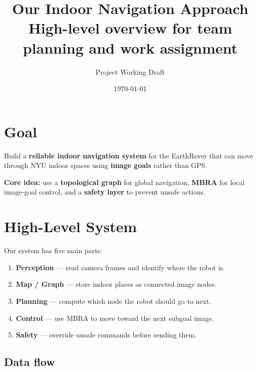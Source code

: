 \documentclass[11pt,a4paper]{article}
\title{Our Indoor Navigation Approach\\[0.3em]
\large High-level overview for team planning and work assignment}
\author{Project Working Draft}
\date{\today}
\begin{document}
\maketitle
\begin{center}
\end{center}
\vspace{1em}

\section{Goal}

Build a \textbf{reliable indoor navigation system} for the EarthRover that can
move through NYU indoor spaces using \textbf{image goals} rather than GPS.

\begin{mdframed}
\textbf{Core idea:} use a \textbf{topological graph} for global navigation,
\textbf{MBRA} for local image-goal control, and a \textbf{safety layer} to
prevent unsafe actions.
\end{mdframed}


\section{High-Level System}

Our system has five main parts:

\begin{enumerate}[nosep]
  \item \textbf{Perception} --- read camera frames and identify where the robot is.
  \item \textbf{Map / Graph} --- store indoor places as connected image nodes.
  \item \textbf{Planning} --- compute which node the robot should go to next.
  \item \textbf{Control} --- use MBRA to move toward the next subgoal image.
  \item \textbf{Safety} --- override unsafe commands before sending them.
\end{enumerate}

\subsection*{Data flow}
\end{document}
